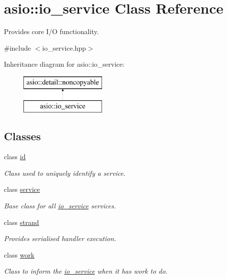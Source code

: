 \hypertarget{classasio_1_1io__service}{}\section{asio\+:\+:io\+\_\+service Class Reference}
\label{classasio_1_1io__service}


Provides core I/\+O functionality.  




{\ttfamily \#include $<$io\+\_\+service.\+hpp$>$}

Inheritance diagram for asio\+:\+:io\+\_\+service\+:\begin{figure}[H]
\begin{center}
\leavevmode
\includegraphics[height=2.000000cm]{classasio_1_1io__service}
\end{center}
\end{figure}
\subsection*{Classes}
\begin{DoxyCompactItemize}
\item 
class \hyperlink{classasio_1_1io__service_1_1id}{id}
\begin{DoxyCompactList}\small\item\em Class used to uniquely identify a service. \end{DoxyCompactList}\item 
class \hyperlink{classasio_1_1io__service_1_1service}{service}
\begin{DoxyCompactList}\small\item\em Base class for all \hyperlink{classasio_1_1io__service}{io\+\_\+service} services. \end{DoxyCompactList}\item 
class \hyperlink{classasio_1_1io__service_1_1strand}{strand}
\begin{DoxyCompactList}\small\item\em Provides serialised handler execution. \end{DoxyCompactList}\item 
class \hyperlink{classasio_1_1io__service_1_1work}{work}
\begin{DoxyCompactList}\small\item\em Class to inform the \hyperlink{classasio_1_1io__service}{io\+\_\+service} when it has work to do. \end{DoxyCompactList}\end{DoxyCompactItemize}
